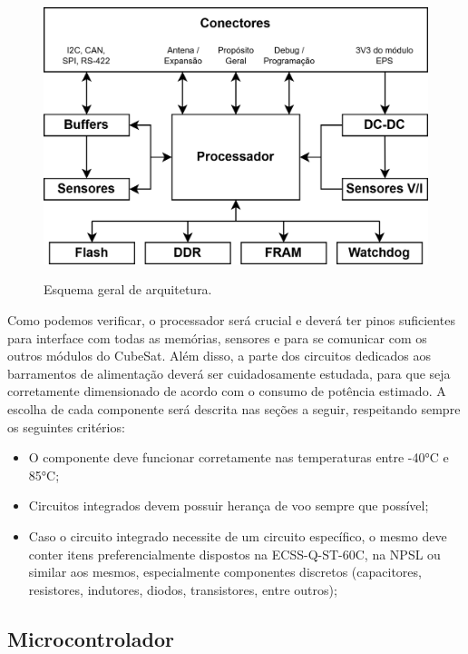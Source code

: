 \begin{figure}[H]
    \centering
    \caption{Esquema geral de arquitetura.}
    \includegraphics[scale=1.2]{images/arquitetura geral.png}
    \label{fig:arq_geral}
\end{figure}

Como podemos verificar, o processador será crucial e deverá ter pinos suficientes para interface com todas as memórias, sensores e para se comunicar com os outros módulos do CubeSat. Além disso, a parte dos circuitos dedicados aos barramentos de alimentação deverá ser cuidadosamente estudada, para que seja corretamente dimensionado de acordo com o consumo de potência estimado. A escolha de cada componente será descrita nas seções a seguir, respeitando sempre os seguintes critérios:

\begin{itemize}
	\item O componente deve funcionar corretamente nas temperaturas entre -40°C e 85°C;
	\item Circuitos integrados devem possuir herança de voo sempre que possível;
	\item Caso o circuito integrado necessite de um circuito específico, o mesmo deve conter itens preferencialmente dispostos na ECSS-Q-ST-60C, na NPSL ou similar aos mesmos, especialmente componentes discretos (capacitores, resistores, indutores, diodos, transistores, entre outros);
\end{itemize}

\subsection{Microcontrolador}

